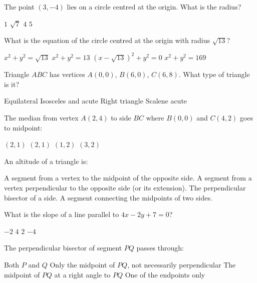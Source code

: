 \documentclass[addpoints]{exam}
\begin{document}
\begin{questions}
\question[1] The point $(3, -4)$ lies on a circle centred at the origin. What is the radius?
\begin{choices}
    \choice $1$
    \choice $\sqrt{7}$
    \choice $4$
    \correctchoice $5$
\end{choices}
\vspace{3mm}

\question[1] What is the equation of the circle centred at the origin with radius $\sqrt{13}$?
\begin{choices}
    \choice $x^2 + y^2 = \sqrt{13}$
    \correctchoice $x^2 + y^2 = 13$
    \choice $(x-\sqrt{13})^2 + y^2 = 0$
    \choice $x^2 + y^2 = 169$
\end{choices}
\vspace{3mm}

\question[1] Triangle $ABC$ has vertices $A(0,0)$, $B(6,0)$, $C(6,8)$. What type of triangle is it?
\begin{choices}
    \choice Equilateral
    \choice Isosceles and acute
    \correctchoice Right triangle
    \choice Scalene acute
\end{choices}
\vspace{3mm}

\question[1] The median from vertex $A(2, 4)$ to side $BC$ where $B(0,0)$ and $C(4, 2)$ goes to midpoint:
\begin{choices}
    \choice $(2, 1)$
    \correctchoice $(2, 1)$
    \choice $(1, 2)$
    \choice $(3, 2)$
\end{choices}
\vspace{3mm}

\question[1] An altitude of a triangle is:
\begin{choices}
    \choice A segment from a vertex to the midpoint of the opposite side.
    \correctchoice A segment from a vertex perpendicular to the opposite side (or its extension).
    \choice The perpendicular bisector of a side.
    \choice A segment connecting the midpoints of two sides.
\end{choices}
\vspace{3mm}

\question[1] What is the slope of a line parallel to $4x - 2y + 7 = 0$?
\begin{choices}
    \choice $-2$
    \choice $4$
    \correctchoice $2$
    \choice $-4$
\end{choices}
\vspace{3mm}

\question[1] The perpendicular bisector of segment $PQ$ passes through:
\begin{choices}
    \choice Both $P$ and $Q$
    \choice Only the midpoint of $PQ$, not necessarily perpendicular
    \correctchoice The midpoint of $PQ$ at a right angle to $PQ$
    \choice One of the endpoints only
\end{choices}
\vspace{3mm}


\end{questions}
\end{document}
